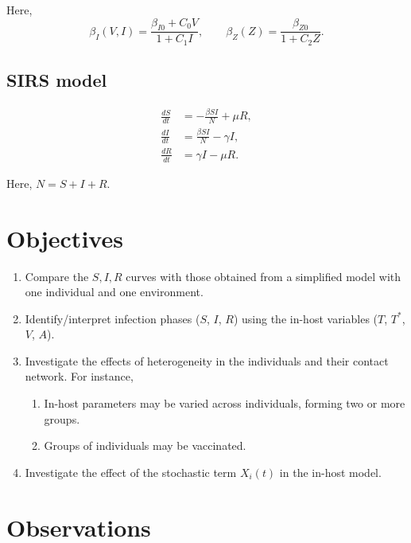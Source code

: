 \documentclass[11pt]{article}
\numberwithin{equation}{subsection}
\begin{document}
    Here, \[
        \beta_I(V, I) = \frac{\beta_{I0} + C_0 V}{1 + C_1 I}, \qquad
        \beta_Z(Z) = \frac{\beta_{Z0}}{1 + C_2 Z}.
    \]


    \subsection{SIRS model} \label{model:SIRS}

    \begin{align}
        \frac{dS}{dt} &= -\frac{\beta SI}{N} + \mu R, \\
        \frac{dI}{dt} &= \frac{\beta SI}{N} - \gamma I, \\
        \frac{dR}{dt} &= \gamma I - \mu R.
    \end{align}

    Here, $N = S + I + R$.


    \section{Objectives}

    \begin{enumerate}
        \item Compare the $S, I, R$ curves with those obtained from a
        simplified model with one individual and one environment.

        \item Identify/interpret infection phases ($S$, $I$, $R$) using the
        in-host variables ($T$, $T^*$, $V$, $A$).

        \item Investigate the effects of heterogeneity in the individuals and
        their contact network. For instance,
        \begin{enumerate}
            \item In-host parameters may be varied across individuals, forming
            two or more groups.
            \item Groups of individuals may be vaccinated.
        \end{enumerate}

        \item Investigate the effect of the stochastic term $X_i(t)$ in the
        in-host model.
    \end{enumerate}


    \section{Observations}
\end{document}

